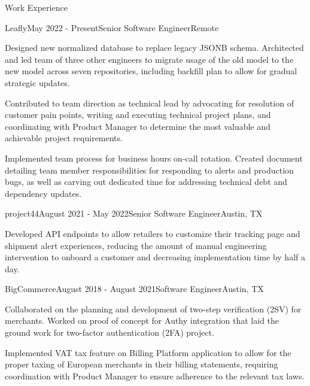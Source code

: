 \documentclass{resume} %
\begin{document}

\begin{rSection}{Work Experience}


\begin{rSubsection}{Leafly}{May 2022 - Present}{Senior Software Engineer}{Remote}
\item Designed new normalized database to replace legacy JSONB schema. Architected and led team of three other engineers to migrate usage of the old model
to the new model across seven repositories, including backfill plan to allow for gradual strategic updates.
\item Contributed to team direction as technical lead by advocating for resolution of customer pain points, writing and executing technical project plans,
and coordinating with Product Manager to determine the most valuable and achievable project requirements.
\item Implemented team process for business hours on-call rotation. Created document detailing team member responsibilities for responding to alerts and
production bugs, as well as carving out dedicated time for addressing technical debt and dependency updates.
\end{rSubsection}


\begin{rSubsection}{project44}{August 2021 - May 2022}{Senior Software Engineer}{Austin, TX}
\item Developed API endpoints to allow retailers to customize their tracking page and shipment alert experiences, reducing the
amount of manual engineering intervention to onboard a customer and decreasing implementation time by half a day.
\end{rSubsection}


\begin{rSubsection}{BigCommerce}{August 2018 - August 2021}{Software Engineer}{Austin, TX}
\item Collaborated on the planning and development of two-step verification (2SV) for merchants. Worked on proof of concept for
Authy integration that laid the ground work for two-factor authentication (2FA) project.
\item Implemented VAT tax feature on Billing Platform application to allow for the proper taxing of European merchants in their billing
statements, requiring coordination with Product Manager to ensure adherence to the relevant tax laws.
\end{rSubsection}


\end{rSection}
\end{document}
